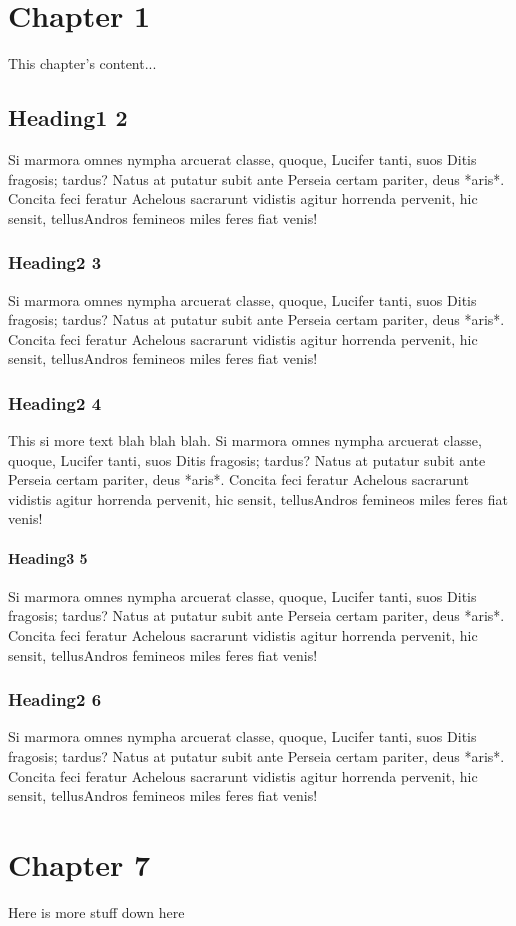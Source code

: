 \chapter{Chapter 1}

This chapter's content...

\section{Heading1 2}

Si marmora omnes nympha arcuerat classe, quoque, Lucifer tanti, suos Ditis
fragosis; tardus? Natus at putatur subit ante Perseia certam pariter, deus
*aris*. Concita feci feratur Achelous sacrarunt vidistis agitur horrenda
pervenit, hic sensit, tellusAndros femineos miles feres fiat venis!

\subsection{Heading2 3}

Si marmora omnes nympha arcuerat classe, quoque, Lucifer tanti, suos Ditis
fragosis; tardus? Natus at putatur subit ante Perseia certam pariter, deus
*aris*. Concita feci feratur Achelous sacrarunt vidistis agitur horrenda
pervenit, hic sensit, tellusAndros femineos miles feres fiat venis!

\subsection{Heading2 4}

This si more text blah blah blah.
Si marmora omnes nympha arcuerat classe, quoque, Lucifer tanti, suos Ditis
fragosis; tardus? Natus at putatur subit ante Perseia certam pariter, deus
*aris*. Concita feci feratur Achelous sacrarunt vidistis agitur horrenda
pervenit, hic sensit, tellusAndros femineos miles feres fiat venis!

\subsubsection{Heading3 5}


Si marmora omnes nympha arcuerat classe, quoque, Lucifer tanti, suos Ditis
fragosis; tardus? Natus at putatur subit ante Perseia certam pariter, deus
*aris*. Concita feci feratur Achelous sacrarunt vidistis agitur horrenda
pervenit, hic sensit, tellusAndros femineos miles feres fiat venis!

\subsection{Heading2 6}

Si marmora omnes nympha arcuerat classe, quoque, Lucifer tanti, suos Ditis
fragosis; tardus? Natus at putatur subit ante Perseia certam pariter, deus
*aris*. Concita feci feratur Achelous sacrarunt vidistis agitur horrenda
pervenit, hic sensit, tellusAndros femineos miles feres fiat venis!

\chapter{Chapter 7}

Here is more stuff down here
